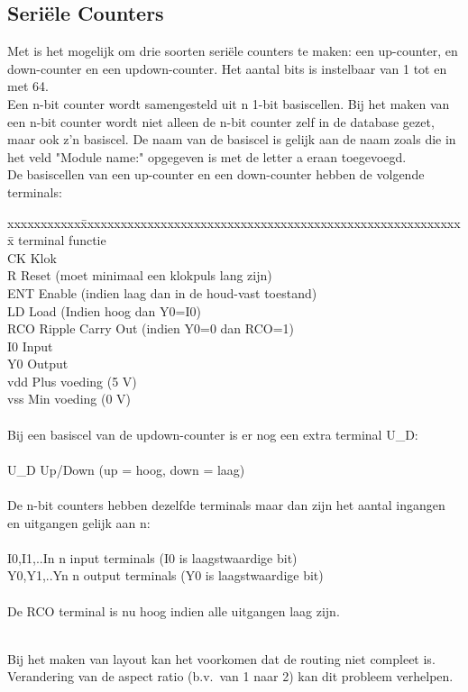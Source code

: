 \subsection{Seri\"ele Counters}

Met   is het mogelijk om drie soorten seri\"ele counters te maken:
een up-counter, en down-counter en een updown-counter. Het aantal bits
is instelbaar van 1 tot en met 64.\\
Een n-bit counter wordt samengesteld uit n 1-bit basiscellen. Bij het maken
van een n-bit counter wordt niet alleen de n-bit counter zelf in de database
gezet, maar ook z'n basiscel. De naam van de basiscel is gelijk aan de 
naam zoals die in het veld "Module name:" opgegeven is met de letter a eraan
toegevoegd.\\
De basiscellen van een up-counter en een down-counter
hebben de volgende terminals:\\
\begin{tabbing}
xxxxxxxxxxx\=xxxxxxxxxxxxxxxxxxxxxxxxxxxxxxxxxxxxxxxxxxxxxxxxxxxxxxxxxx\=\kill
terminal \>functie\\
CK \> Klok\\
R \> Reset (moet minimaal een klokpuls lang zijn)\\
ENT \> Enable (indien laag dan in de houd-vast toestand)\\
LD \> Load (Indien hoog dan Y0=I0)\\
RCO \> Ripple Carry Out (indien Y0=0 dan RCO=1)\\
I0 \> Input\\
Y0 \> Output\\
vdd \> Plus voeding (5 V)\\
vss \> Min voeding (0 V)\\
\\
Bij een basiscel van de updown-counter is er nog een extra terminal U\_D:\\
\\
U\_D \> Up/Down (up = hoog, down = laag)\\
\\
De n-bit counters hebben dezelfde terminals maar dan zijn het aantal
ingangen en uitgangen gelijk aan n:\\
\\
I0,I1,..In \> n input terminals (I0 is laagstwaardige bit)\\
Y0,Y1,..Yn \> n output terminals (Y0 is laagstwaardige bit)\\
\\
De RCO terminal is nu hoog indien alle uitgangen laag zijn.\\
\\
\end{tabbing}
Bij het maken van layout kan het voorkomen dat de routing niet compleet is.\\
Verandering van de aspect ratio (b.v.\ van 1 naar 2) kan dit probleem verhelpen.

\cleardoublepage
